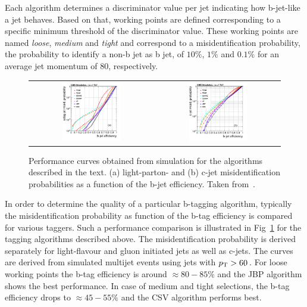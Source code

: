 Each algorithm determines a discriminator value per jet indicating how b-jet-like a jet behaves. Based on that, working points are defined corresponding to a specific minimum threshold of the discriminator value. These working points are named \textit{loose}, \textit{medium} and \textit{tight} and correspond to a misidentification probability, \ie the probability to identify a non-b jet as b jet, of $10\%$, $1\%$ and $0.1\%$ for an average jet momentum of $80$\gev, respectively. \\
\begin{figure}[!tp]
  \centering 
  \begin{tabular}{cc}
    \includegraphics[width=0.49\textwidth]{figures/figAlgo_Combined_udsgvsb_Efficienies.png} &
    \includegraphics[width=0.49\textwidth]{figures/figAlgo_Combined_cvsb_Efficienies.png} 
  \end{tabular}
  \caption{Performance curves obtained from simulation for the algorithms described in the text. (a) light-parton- and (b) c-jet misidentification probabilities as a function of the b-jet efficiency. Taken from~\cite{Chatrchyan:2012jua}.}
  \label{fig:btagging}
\end{figure}
In order to determine the quality of a particular b-tagging algorithm, typically the misidentification probability as function of the b-tag efficiency is compared for various taggers. Such a performance comparison is illustrated in Fig~\ref{fig:btagging} for the tagging algorithms described above. The misidentification probability is derived separately for light-flavour and gluon initiated jets as well as c-jets. The curves are derived from simulated multijet events using jets with $p_{\text{T}} > 60$\,\gev. For loose working points the b-tag efficiency is around $\approx 80-85\%$ and the JBP algorithm shows the best performance. In case of medium and tight selections, the b-tag efficiency drops to $\approx 45-55\%$ and the CSV algorithm performs best. \\
